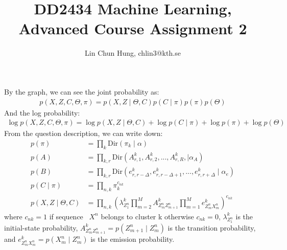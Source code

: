 \documentclass[12pt]{article}
\newenvironment{problem}[2][Problem]{\begin{trivlist}
\item[\hskip \labelsep {\bfseries #1}\hskip \labelsep {\bfseries #2.}]}{\end{trivlist}}
\begin{document}
 
 
\title{DD2434 Machine Learning, Advanced Course Assignment 2}
\author{Lin Chun Hung, chlin3@kth.se}
\maketitle

\begin{problem}{2.8.24}
By the graph, we can see the joint probability as:
\begin{align*}
    p(X, Z, C, \Theta, \pi) = p(X, Z \mid \Theta, C) p(C\mid \pi) p(\pi) p(\Theta)
\end{align*}
And the log probability:
\begin{align*}
    \log p(X, Z, C, \Theta, \pi) = 
    \log p(X, Z \mid \Theta, C) + \log p(C\mid \pi) +\log p(\pi) + \log p(\Theta)
\end{align*}
From the question description, we can write down:
\begin{align*}
    p(\pi) &= \prod_{k} \mathrm{Dir}(\pi_k\mid \alpha) \\
    p(A) &= \prod_{k,r} \mathrm{Dir}(A^k_{r,1}, A^k_{r,2}, ..., A^k_{r,R},\mid \alpha_A) \\
    p(B) &= \prod_{k,r} \mathrm{Dir}(e^k_{r,r-\Delta}, e^k_{r,r-\Delta +1}, ..., e^k_{r,r+\Delta}\mid \alpha_e) \\
    p(C\mid \pi) &= \prod_{n,k} \pi_k^{c_{nk}} \\
    p(X, Z\mid \Theta, C) &= 
        \prod_{n,k}(\lambda^k_{Z^n_{1}}
        \prod_{m=2}^{M} A^k_{Z^n_{m}Z^n_{m+1}}
        \prod_{m=1}^{M} e^k_{Z^n_{m}X^n_{m}})^{c_{nk}}
\end{align*}
where $c_{nk}=1$ if sequence ~$X^n$ belongs to cluster k otherwise $c_{nk}=0$,
      $\lambda^k_{Z^n_{1}}$ is the initial-state probability,
      $A^k_{Z^n_{m}Z^n_{m+1}} = p(Z^n_{m+1}\mid Z^n_{m})$ is the transition probability,
  and $e^k_{Z^n_{m}X^n_{m}} = p(X^n_{m}\mid Z^n_{m})$ is the emission probability.

\end{problem}
\end{document}
